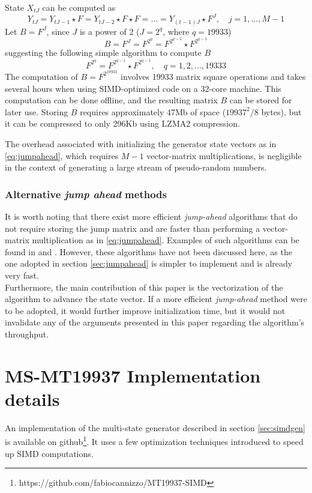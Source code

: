 \documentclass[preprint,1p,times]{elsarticle}
\begin{document}
State $X_{tJ}$ can be computed as
\begin{equation}
\label{eq:jumpahead}
    Y_{tJ} = Y_{tJ-1} \star F = Y_{tJ-2}  \star F \star F = \ldots = Y_{(t-1)J}  \star F^{J}, \quad j=1,\dots,M-1
\end{equation}
Let $B=F^J$, since $J$ is a power of 2 ($J=2^{q}$, where $q=19933$)
$$
    B=F^{J}=F^{2^q}=F^{2^{q-1}} \star F^{2^{q-1}}
$$
suggesting the following simple algorithm to compute $B$
$$
    F^{2^q} = F^{2^{q-1}} \star F^{2^{q-1}}, \quad q=1, 2, \dots, 19333
$$
The computation of $B=F^{2^{19933}}$ involves 19933 matrix square operations and takes several hours when using SIMD-optimized code on a 32-core machine. This computation can be done offline, and the resulting matrix $B$ can be stored for later use. Storing $B$ requires approximately 47Mb of space ($19937^2/8$ bytes), but it can be compressed to only 296Kb using LZMA2 compression.

The overhead associated with initializing the generator state vectors as in \eqref{eq:jumpahead}, which requires $M-1$ vector-matrix multiplications, is negligible in the context of generating a large stream of pseudo-random numbers.

\subsubsection{Alternative \textit{jump ahead} methods}
It is worth noting that there exist more efficient \textit{jump-ahead} algorithms that do not require storing the jump matrix and are faster than performing a vector-matrix multiplication as in \eqref{eq:jumpahead}. Examples of such algorithms can be found in \cite{jump1} and \cite{jump2}. However, these algorithms have not been discussed here, as the one adopted in section \ref{sec:jumpahead} is simpler to implement and is already very fast.\\

Furthermore, the main contribution of this paper is the vectorization of the algorithm to advance the state vector. If a more efficient \textit{jump-ahead} method were to be adopted, it would further improve initialization time, but it would not invalidate any of the arguments presented in this paper regarding the algorithm's throughput.

\section{MS-MT19937 Implementation details}
An implementation of the multi-state generator described in section \ref{sec:simdgen} is available on github\footnote{\label{fn:github} https://github.com/fabiocannizzo/MT19937-SIMD}. It uses a few optimization techniques introduced to speed up SIMD computations.
\end{document}
